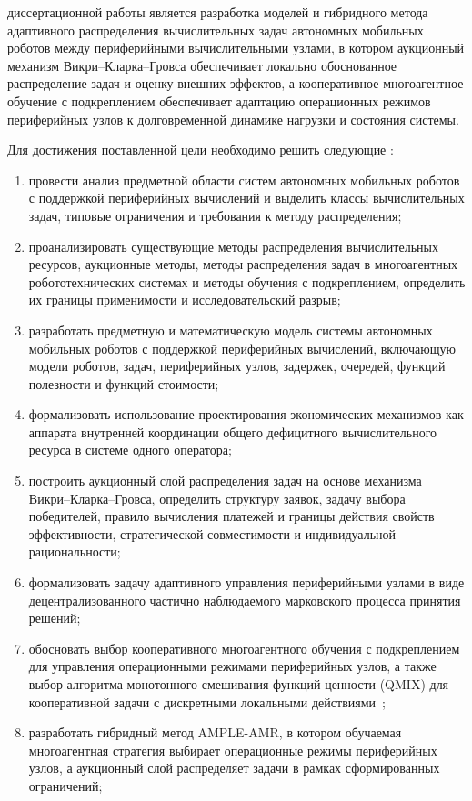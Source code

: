 \aim диссертационной работы является разработка моделей и гибридного метода адаптивного распределения вычислительных задач автономных мобильных роботов между периферийными вычислительными узлами, в котором аукционный механизм Викри--Кларка--Гровса обеспечивает локально обоснованное распределение задач и оценку внешних эффектов, а кооперативное многоагентное обучение с подкреплением обеспечивает адаптацию операционных режимов периферийных узлов к долговременной динамике нагрузки и состояния системы.

Для достижения поставленной цели необходимо решить следующие \tasks:
\begin{enumerate}
    \item провести анализ предметной области систем автономных мобильных роботов с поддержкой периферийных вычислений и выделить классы вычислительных задач, типовые ограничения и требования к методу распределения;
	\item проанализировать существующие методы распределения вычислительных ресурсов, аукционные методы, методы распределения задач в многоагентных робототехнических системах и методы обучения с подкреплением, определить их границы применимости и исследовательский разрыв;
	\item разработать предметную и математическую модель системы автономных мобильных роботов с поддержкой периферийных вычислений, включающую модели роботов, задач, периферийных узлов, задержек, очередей, функций полезности и функций стоимости;
	\item формализовать использование проектирования экономических механизмов как аппарата внутренней координации общего дефицитного вычислительного ресурса в системе одного оператора;
	\item построить аукционный слой распределения задач на основе механизма Викри--Кларка--Гровса, определить структуру заявок, задачу выбора победителей, правило вычисления платежей и границы действия свойств эффективности, стратегической совместимости и индивидуальной рациональности;
	\item формализовать задачу адаптивного управления периферийными узлами в виде децентрализованного частично наблюдаемого марковского процесса принятия решений;
	\item обосновать выбор кооперативного многоагентного обучения с подкреплением для управления операционными режимами периферийных узлов, а также выбор алгоритма монотонного смешивания функций ценности (QMIX) для кооперативной задачи с дискретными локальными действиями~\cite{Rashid2018QMIX};
	\item разработать гибридный метод AMPLE-AMR, в котором обучаемая многоагентная стратегия выбирает операционные режимы периферийных узлов, а аукционный слой распределяет задачи в рамках сформированных ограничений;

\end{enumerate}
